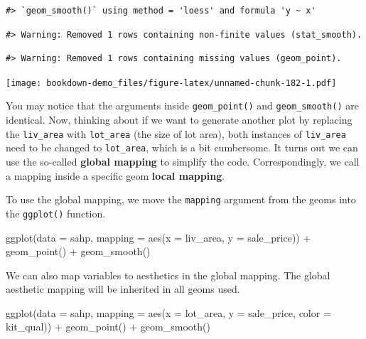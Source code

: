 \documentclass[
]{book}
\newenvironment{Shaded}{\begin{snugshade}}{\end{snugshade}}
\newcommand{\AttributeTok}[1]{\textcolor[rgb]{0.77,0.63,0.00}{#1}}
\newcommand{\FunctionTok}[1]{\textcolor[rgb]{0.00,0.00,0.00}{#1}}
\newcommand{\NormalTok}[1]{#1}
\newcommand{\SpecialCharTok}[1]{\textcolor[rgb]{0.00,0.00,0.00}{#1}}
\begin{document}
\begin{verbatim}
#> `geom_smooth()` using method = 'loess' and formula 'y ~ x'
\end{verbatim}

\begin{verbatim}
#> Warning: Removed 1 rows containing non-finite values (stat_smooth).
\end{verbatim}

\begin{verbatim}
#> Warning: Removed 1 rows containing missing values (geom_point).
\end{verbatim}

\texttt{[image: bookdown-demo\_files/figure-latex/unnamed-chunk-182-1.pdf]}

You may notice that the arguments inside \texttt{geom\_point()} and \texttt{geom\_smooth()} are identical. Now, thinking about if we want to generate another plot by replacing the \texttt{liv\_area} with \texttt{lot\_area} (the size of lot area), both instances of \texttt{liv\_area} need to be changed to \texttt{lot\_area}, which is a bit cumbersome. It turns out we can use the so-called \textbf{global mapping} to simplify the code. Correspondingly, we call a mapping inside a specific geom \textbf{local mapping}.

To use the global mapping, we move the \texttt{mapping} argument from the geoms into the \texttt{ggplot()} function.

\begin{Shaded}
\begin{Highlighting}[]
\FunctionTok{ggplot}\NormalTok{(}\AttributeTok{data =}\NormalTok{ sahp, }\AttributeTok{mapping =} \FunctionTok{aes}\NormalTok{(}\AttributeTok{x =}\NormalTok{ liv\_area, }\AttributeTok{y =}\NormalTok{ sale\_price)) }\SpecialCharTok{+} \FunctionTok{geom\_point}\NormalTok{() }\SpecialCharTok{+} \FunctionTok{geom\_smooth}\NormalTok{()}
\end{Highlighting}
\end{Shaded}

We can also map variables to aesthetics in the global mapping. The global aesthetic mapping will be inherited in all geoms used.

\begin{Shaded}
\begin{Highlighting}[]
\FunctionTok{ggplot}\NormalTok{(}\AttributeTok{data =}\NormalTok{ sahp, }\AttributeTok{mapping =} \FunctionTok{aes}\NormalTok{(}\AttributeTok{x =}\NormalTok{ lot\_area, }\AttributeTok{y =}\NormalTok{ sale\_price, }\AttributeTok{color =}\NormalTok{ kit\_qual)) }\SpecialCharTok{+} \FunctionTok{geom\_point}\NormalTok{() }\SpecialCharTok{+} \FunctionTok{geom\_smooth}\NormalTok{()}
\end{Highlighting}
\end{Shaded}
\end{document}
